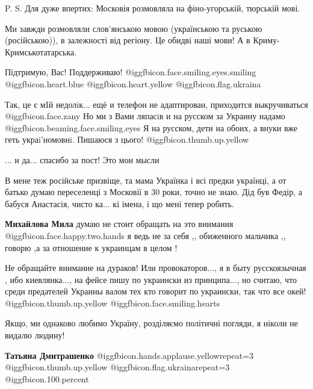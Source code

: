 \begin{itemize}
P. S. Для дуже впертих: Московія розмовляла на фіно-угорській, тюрській мові.

Ми завжди розмовляли слов'янською мовою (українською та руською (російською)),
в залежності від регіону. Це обидві наші мови! А в Криму- Кримськотатарська.


Підтримую, Вас! Поддерживаю! @igg{fbicon.face.smiling.eyes.smiling}  @igg{fbicon.heart.blue}  @igg{fbicon.heart.yellow} @igg{fbicon.flag.ukraina}

Так, це є мIй недолiк... ещё и телефон не адаптирован, приходится выкручиваться @igg{fbicon.face.zany} 
Но ми з Вами ляпасiв и на русском за Украину надамо @igg{fbicon.beaming.face.smiling.eyes} 
Я на русском, дети на обоих, а внуки вже геть украi’номовнi.
Пишаюся з цього! @igg{fbicon.thumb.up.yellow} 

... и да... спасибо за пост! Это мои мысли


В мене теж російське призвіще, та мама Українка і всі предки українці, а от
батько думаю переселенці з Московії в 30 роки, точно не знаю. Дід був Федір, а
бабуся Анастасія, чисто ка... кі імена, і що мені тепер робить.

\begin{itemize} %
\textbf{Михайлова Мила} думаю не стоит обращать на это внимания  @igg{fbicon.face.happy.two.hands}  я ведь не за себя ,, обиженного мальчика ,, говорю ,а за отношение к украинцам в целом !
\end{itemize} %


Не обращайте внимание на дураков! Или провокаторов..., я в быту русскоязычная ,
ибо киевлянка..., на фейсе пишу по украински из принципа..., но считаю, что
среди предателей Украины валом тех кто говорит по украински, так что все
окей! @igg{fbicon.thumb.up.yellow}  @igg{fbicon.face.smiling.hearts} 


Якщо, ми однаково любимо Україну, розділяємо політичні погляди, я ніколи не
видалю людину!

\begin{itemize} %
\textbf{Татьяна Дмитрашенко}  @igg{fbicon.hands.applause.yellow}{repeat=3}  @igg{fbicon.thumb.up.yellow} @igg{fbicon.flag.ukraina}{repeat=3} @igg{fbicon.100.percent} 
\end{itemize} %


\end{itemize}
